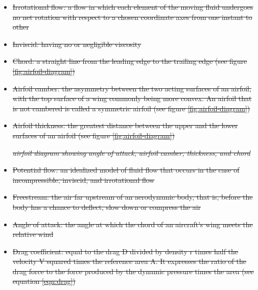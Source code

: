 \documentclass{journal}
\providecommand{\DIFdel}[1]{{\protect\color{red}\sout{#1}}}                      %
\providecommand{\DIFdelFL}[1]{\DIFdel{#1}} %
\begin{document}
\begin{itemize}
\item%
\DIFdel{Irrotational flow: a flow in which each element of the moving fluid undergoes no net rotation with respect to a chosen coordinate axes from one instant to other
		}%
\item%
\DIFdel{Inviscid: having no or negligible viscosity
		}%
\item%
\DIFdel{Chord: a straight line from the leading edge to the trailing edge (see figure \ref{fig:airfoil-diagram})
		}%
\item%
\DIFdel{Airfoil camber: the asymmetry between the two acting surfaces of an airfoil, with the top surface of a wing commonly being more convex. An airfoil that is not cambered is called a symmetric airfoil (see figure \ref{fig:airfoil-diagram})
		}%
\item%
\DIFdel{Airfoil thickness: the greatest distance between the upper and the lower surfaces of an airfoil (see figure \ref{fig:airfoil-diagram})
		}%

{%
\emph{\DIFdelFL{airfoil diagram showing angle of attack, airfoil camber, thickness, and chord}}%
}

\item%
\DIFdel{Potential flow: an idealized model of fluid flow that occurs in the case of incompressible, inviscid, and irrotational flow
		}%
\item%
\DIFdel{Freestream: the air far upstream of an aerodynamic body, that is, before the body has a chance to deflect, slow down or compress the air
		}%
\item%
\DIFdel{Angle of attack: the angle at which the chord of an aircraft's wing meets the relative wind
		}%
\item%
\DIFdel{Drag coefficient: equal to the drag D divided by density r times half the velocity V squared times the reference area A. It expresses the ratio of the drag force to the force produced by the dynamic pressure times the area (see equation \ref{eqn:drag})
		}%


\end{itemize}
\end{document}
